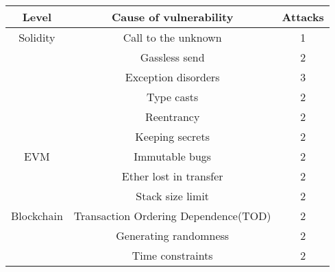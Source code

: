 \documentclass{llncs}
\begin{document}
\begin{center}
\begin{tabular}{|c|c|c|}
\hline
\textbf{Level}	&\textbf{Cause of vulnerability}	&\textbf{Attacks}\\	\hline
Solidity	&Call to the unknown		&1		\\	\hline
\			&Gassless send				&2		\\	\hline
\			&Exception disorders		&3		\\	\hline
\			&Type casts					&2		\\	\hline
\			&Reentrancy					&2		\\	\hline
\			&Keeping secrets			&2		\\	\hline
EVM			&Immutable bugs				&2		\\	\hline
\			&Ether lost in transfer		&2		\\	\hline
\			&Stack size limit			&2		\\	\hline
Blockchain	&Transaction Ordering Dependence(TOD)	&2	\\	\hline
\			&Generating randomness		&2		\\	\hline
\			&Time constraints			&2		\\	\hline

\end{tabular}
\end{center}
\end{document}
